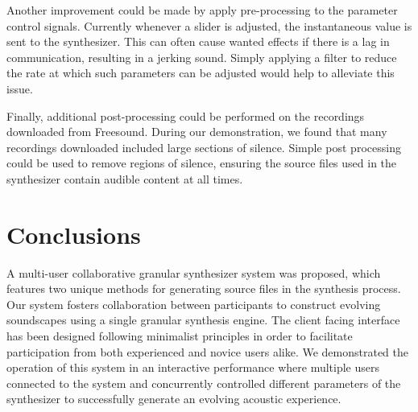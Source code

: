 \documentclass{nime-alternate}
\begin{document}
Another improvement could be made by apply pre-processing to the parameter control signals.
Currently whenever a slider is adjusted, the instantaneous value is sent to the synthesizer. 
This can often cause wanted effects if there is a lag in communication, resulting in a jerking sound.
Simply applying a filter to reduce the rate at which such parameters can be adjusted would help to alleviate this issue. 

Finally, additional post-processing could be performed on the recordings downloaded from Freesound.
During our demonstration, we found that many recordings downloaded included large sections of silence.
Simple post processing could be used to remove regions of silence, ensuring the source files
used in the synthesizer contain audible content at all times. 

\section{Conclusions}

A multi-user collaborative granular synthesizer system was proposed, which features two 
unique methods for generating source files in the synthesis process. 
Our system fosters collaboration between participants to construct evolving soundscapes
using a single granular synthesis engine. 
The client facing interface has been designed following minimalist principles in order to
facilitate participation from both experienced and novice users alike.  
We demonstrated the operation of this system in an interactive performance where multiple
users connected to the system and concurrently controlled different parameters of the synthesizer
to successfully generate an evolving acoustic experience.



%
%
\end{document}
